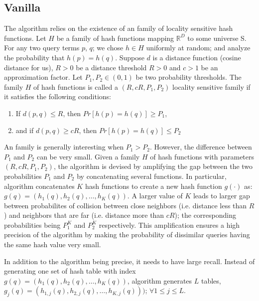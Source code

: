 \subsection{Vanilla \lsh}
\label{sec:vlsh}
The \lsh algorithm relies on the existence of an family of locality sensitive hash functions. 
Let $H$ be a family of hash functions mapping 
 $\mathbb{R}^D$ to some universe S. For any two query terms $p$, $q$; we chose $h\in H$ uniformly at random; 
 and analyze the probability that $h(p) = h(q)$.  
 Suppose $d$ is a distance function (cosine distance for us), 
$R > 0$ be a distance threshold $R>0$ and $c>1$ be an approximation factor.   
Let $P_1, P_2 \in (0, 1)$ be two probability thresholds.  
The family $H$ of hash functions is called a $(R, cR, P_1, P_2)$ locality sensitive family if 
 it satisfies the following conditions:
\begin{enumerate}
\item If $d(p,q) \leq R$, then $Pr[h(p)=h(q)] \geq P_1$, 
\item and if $d(p,q) \geq cR$, then $Pr[h(p)=h(q)] \leq P_2$
\end{enumerate}
An \lsh family is generally interesting when  $P_1>P_2$. 
However, the difference between $P_1$ and $P_2$ can be very small. 
Given a family $H$ of hash functions with parameters $(R, cR, P_1,P_2)$, 
the \lsh algorithm is devised by amplifying the gap between 
the two probabilities $P_1$ and $P_2$ by concatenating several functions. 
In particular, \lsh algorithm concatenates $K$ hash functions
to create a new hash function $g(\cdot)$ as:
$g(q)=(h_1(q),h_2(q),\dots,h_K(q))$. 
A larger value of $K$ leads to larger 
gap between probabilites of collision between close neighbors (i.e. distance less than $R$) and neighbors that are far (i.e. 
distance more than $cR$); 
the corresponding probabilities being $P_1^{K}$ and $P_2^{K}$ respectively. 
This amplification ensures a high precision of the algorithm by  
making the probability of dissimilar queries having the same hash value very small.

In addition to the \lsh algorithm being precise, it needs to have large recall. 
Instead of generating one set of hash table with index $g(q)=(h_1(q),h_2(q),\dots,h_K(q))$, 
\lsh algorithm generates $L$ tables, $g_j(q)=(h_{1,j}(q),h_{2,j}(q),\dots,h_{K,j}(q)))$; $\forall 1 \leq j \leq  L$. 


